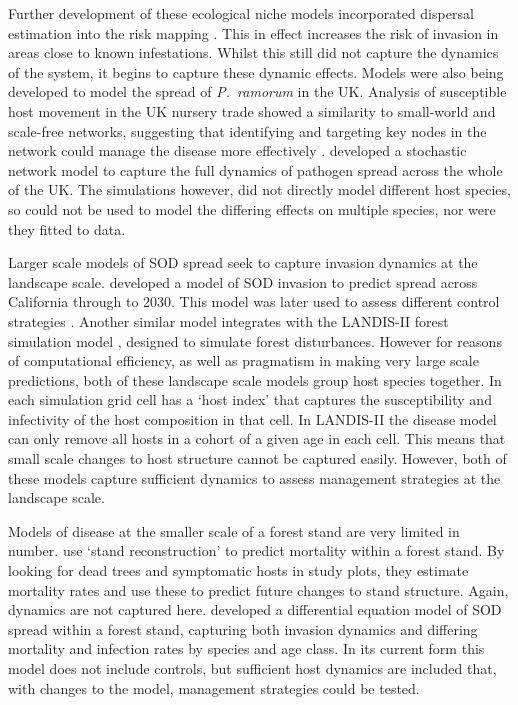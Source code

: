 Further development of these ecological niche models incorporated dispersal estimation into the risk mapping \citep{meentemeyer_early_2008}. This in effect increases the risk of invasion in areas close to known infestations. Whilst this still did not capture the dynamics of the system, it begins to capture these dynamic effects. Models were also being developed to model the spread of \emph{P.~ramorum} in the UK\@. Analysis of susceptible host movement in the UK nursery trade showed a similarity to small-world and scale-free networks, suggesting that identifying and targeting key nodes in the network could manage the disease more effectively \citep{pautasso_epidemiological_2008, jeger_modelling_2007}. \citet{harwood_epidemiological_2009} developed a stochastic network model to capture the full dynamics of pathogen spread across the whole of the UK\@. The simulations however, did not directly model different host species, so could not be used to model the differing effects on multiple species, nor were they fitted to data.

Larger scale models of SOD spread seek to capture invasion dynamics at the landscape scale. \citet{meentemeyer_epidemiological_2011} developed a model of SOD invasion to predict spread across California through to 2030. This model was later used to assess different control strategies \citep{cunniffe_modelling_2016}. Another similar model \citep{tonini_modeling_2018} integrates with the LANDIS-II forest simulation model \citep{scheller_design_2007}, designed to simulate forest disturbances. However for reasons of computational efficiency, as well as pragmatism in making very large scale predictions, both of these landscape scale models group host species together. In \citet{meentemeyer_epidemiological_2011} each simulation grid cell has a `host index' that captures the susceptibility and infectivity of the host composition in that cell. In LANDIS-II the disease model can only remove all hosts in a cohort of a given age in each cell. This means that small scale changes to host structure cannot be captured easily. However, both of these models capture sufficient dynamics to assess management strategies at the landscape scale.

Models of disease at the smaller scale of a forest stand are very limited in number. \citet{brown_forest_2009} use `stand reconstruction' to predict mortality within a forest stand. By looking for dead trees and symptomatic hosts in study plots, they estimate mortality rates and use these to predict future changes to stand structure. Again, dynamics are not captured here. \citet{cobb_ecosystem_2012} developed a differential equation model of SOD spread within a forest stand, capturing both invasion dynamics and differing mortality and infection rates by species and age class. In its current form this model does not include controls, but sufficient host dynamics are included that, with changes to the model, management strategies could be tested.


